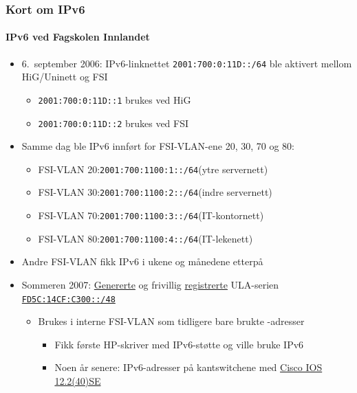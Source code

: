 \begin{frame}%
  \frametitle{Kort om IPv6}
  \framesubtitle{IPv6 ved Fagskolen Innlandet}
  \begin{itemize}[<+->]
  \item 6.~september 2006: IPv6-linknettet
    \texttt{2001:700:0:11D::/64} ble aktivert mellom HiG/Uninett og
    FSI
    \begin{itemize}[<+->]
    \item \texttt{2001:700:0:11D::1} brukes ved HiG
    \item \texttt{2001:700:0:11D::2} brukes ved FSI
    \end{itemize}
  \item Samme dag ble IPv6 innført for FSI-VLAN-ene 20, 30, 70 og 80:
    \begin{itemize}[<+->]
    \item FSI-VLAN 20:\quad\texttt{2001:700:1100:1::/64}\hfill(ytre servernett)
    \item FSI-VLAN 30:\quad\texttt{2001:700:1100:2::/64}\hfill(indre servernett)
    \item FSI-VLAN 70:\quad\texttt{2001:700:1100:3::/64}\hfill(IT-kontornett)
    \item FSI-VLAN 80:\quad\texttt{2001:700:1100:4::/64}\hfill(IT-lekenett)
    \end{itemize}
  \item Andre FSI-VLAN fikk IPv6 i ukene og månedene etterpå
  \item Sommeren 2007:
    \href{http://www.sixxs.net/tools/grh/ula/}{Genererte} og frivillig
    \href{http://www.sixxs.net/tools/grh/ula/list/}{registrerte}
    ULA-serien
    \href{http://www.sixxs.net/tools/whois/?fd5c:14cf:c300::/48}{\texttt{FD5C:14CF:C300::/48}}
    \begin{itemize}[<+->]
    \item Brukes i interne FSI-VLAN som tidligere bare brukte -adresser
      \begin{itemize}[<+->]
      \item Fikk første HP-skriver med IPv6-støtte og ville bruke IPv6
      \item Noen år senere: IPv6-adresser på kantswitchene med
        \href{http://www.cisco.com/en/US/docs/switches/lan/catalyst3750/software/release/12.2_40_se/release/notes/OL13860.html}{Cisco
          IOS 12.2(40)SE}
      \end{itemize}
    \end{itemize}
  \end{itemize}
\end{frame}


